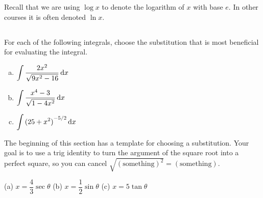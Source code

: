 %
%

\noindent
Recall that we are using $\log x$ to denote the logarithm of $x$ with
base $e$. In other courses it is often denoted $\ln x$.


\subsection*{\Conceptual}



\begin{Mquestion}[2015A]\label{prob:s1.9_1}
For each of the following integrals, choose the substitution that
is most beneficial for evaluating the integral.
\begin{enumerate}[(a)]
\item
$\displaystyle \int \frac{2x^2}{\sqrt{9x^2-16}} \, \mathrm{d}x$

\item $\displaystyle \int \frac{x^4-3}{\sqrt{1-4x^2}} \, \mathrm{d}x$

\item $\displaystyle \int {(25+x^2)}^{-5/2} \, \mathrm{d}x$
\end{enumerate}


\end{Mquestion}

\begin{hint}
The beginning of this section has a template for choosing a substitution. Your goal is to use a trig identity to turn the argument of the square root into a perfect square, so you can cancel $\sqrt{(\mbox{something})^2}=(\mbox{something})$.
\end{hint}

\begin{answer}
(a) $x=\dfrac{4}{3}\sec\theta$
\qquad (b) $x=\dfrac{1}{2}\sin\theta$
\qquad (c) $x=5\tan\theta$
\end{answer}

